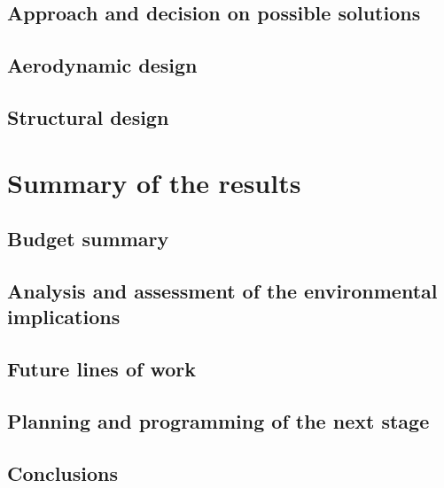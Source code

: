 \documentclass[11pt, a4paper, twoside]{book}
\begin{document}
\section{Approach and decision on possible solutions}


\newpage
\section{Aerodynamic design}


\section{Structural design}


\chapter{Summary of the results}

\section{Budget summary}

\section{Analysis and assessment of the environmental implications}

\section{Future lines of work}

\section{Planning and programming of the next stage}

\section{Conclusions}



\raggedleft

\end{document}
